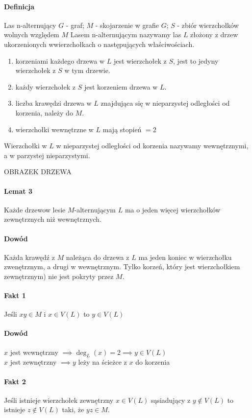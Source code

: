 \paragraph{Definicja}{Las n-alternujący}
$G$ - graf; $M$ - skojarzenie w grafie $G$; $S$ - zbiór wierzchołków wolnych względem $M$
Lasem n-alternującym nazywamy las $L$ złożony z drzew ukorzenionych wwierzchołkach o następujących właściwościach.
\begin{enumerate}
	\item korzeniami każdego drzewa w $L$ jest wierzchołek z $S$, jest to jedyny wierzchołek z $S$ w tym drzewie.
	\item każdy wierzchołek z $S$ jest korzeniem drzewa w $L$.
	\item liczba krawędzi drzewa w $L$ znajdująca się w nieparzystej odległości od korzenia, należy do $M$.
	\item wierzchołki wewnętrzne w $L$ mają stopień $= 2$
\end{enumerate} 
Wierzchołki w $L$ w nieparzystej odległości od korzenia nazywamy wewnętrznymi, a w parzystej nieparzystymi.

OBRAZEK DRZEWA

\paragraph{Lemat 3}
Każde drzewow lesie $M$-alternującym $L$ ma o jeden więcej wierzchołków zewnętrznych niż wewnętrznych.
\paragraph{Dowód}
Każda krawędź z $M$ należąca do drzewa z $L$ ma jeden koniec w wierzchołku zwenętrznym, a drugi w wewnętrznym. 
Tylko korzeń, który jest wierzchołkiem zewnętrznym) nie jest pokryty przez $M$.

\paragraph{Fakt 1}
Jeśli $xy \in M$ i $x \in V(L)$ to $y \in V(L)$
\paragraph{Dowód}
$x$ jest wewnętrzny $\implies \deg_L(x) = 2 \implies y \in V(L)$ \\
$x$ jest zewnętrzny $\implies y$ leży na ścieżce z $x$ do korzenia

\paragraph{Fakt 2}
Jeśli istnieje wierzchołek zewnętrzny $x \in V(L)$ sąsiadujący z $y \not\in V(L)$ to istnieje $z \not\in V(L)$ taki, że $yz \in M$.
